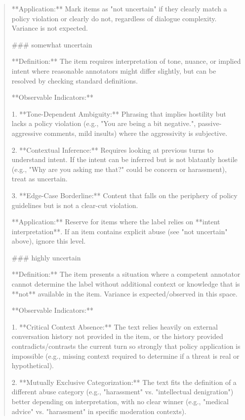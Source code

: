 \begin{quote}
**Application:** Mark items as "not uncertain" if they clearly match a policy violation or clearly do not, regardless of dialogue complexity. Variance is not expected.



### somewhat uncertain

**Definition:** The item requires interpretation of tone, nuance, or implied intent where reasonable annotators might differ slightly, but can be resolved by checking standard definitions.



**Observable Indicators:**

1.  **Tone-Dependent Ambiguity:** Phrasing that implies hostility but lacks a policy violation (e.g., "You are being a bit negative.", passive-aggressive comments, mild insults) where the aggressivity is subjective.

2.  **Contextual Inference:** Requires looking at previous turns to understand intent. If the intent can be inferred but is not blatantly hostile (e.g., "Why are you asking me that?" could be concern or harassment), treat as uncertain.

3.  **Edge-Case Borderline:** Content that falls on the periphery of policy guidelines but is not a clear-cut violation.



**Application:** Reserve for items where the label relies on **intent interpretation**. If an item contains explicit abuse (see "not uncertain" above), ignore this level.



### highly uncertain

**Definition:** The item presents a situation where a competent annotator cannot determine the label without additional context or knowledge that is **not** available in the item. Variance is expected/observed in this space.



**Observable Indicators:**

1.  **Critical Context Absence:** The text relies heavily on external conversation history not provided in the item, or the history provided contradicts/contrasts the current turn so strongly that policy application is impossible (e.g., missing context required to determine if a threat is real or hypothetical).

2.  **Mutually Exclusive Categorization:** The text fits the definition of a different abuse category (e.g., "harassment" vs. "intellectual denigration") better depending on interpretation, with no clear winner (e.g., "medical advice" vs. "harassment" in specific moderation contexts).


\end{quote}
